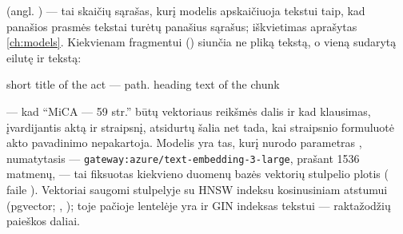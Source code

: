  (angl. ) --- tai skaičių sąrašas, kurį modelis apskaičiuoja
tekstui taip, kad panašios prasmės tekstai turėtų panašius sąrašus; iškvietimas aprašytas
\cref{ch:models}. Kiekvienam fragmentui  () siunčia ne
pliką tekstą, o vieną sudarytą eilutę ir tekstą:

\begin{codeblock}
{short title of the act} — {path}. {heading}
{text of the chunk}
\end{codeblock}

--- kad \enquote{MiCA — 59 str.} būtų vektoriaus reikšmės dalis ir kad klausimas, įvardijantis
aktą ir straipsnį, atsidurtų šalia net tada, kai straipsnio formuluotė akto pavadinimo
nepakartoja. Modelis yra tas, kurį nurodo parametras , numatytasis ---
\texttt{gateway:azure/text-embedding-3-large}, prašant 1536 matmenų, --- tai fiksuotas kiekvieno
duomenų bazės vektorių stulpelio plotis ( faile ).
Vektoriai saugomi stulpelyje  su HNSW indeksu kosinusiniam atstumui
(pgvector; , ); toje pačioje lentelėje yra ir GIN
indeksas tekstui --- raktažodžių paieškos daliai.

